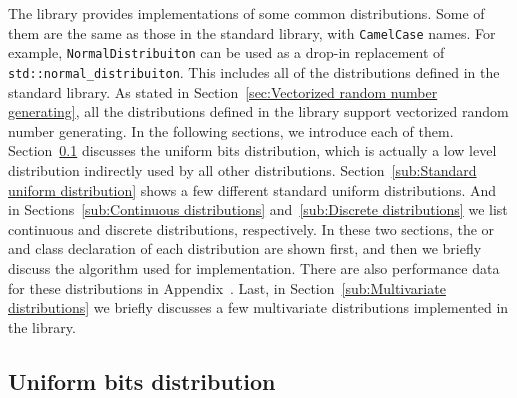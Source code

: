 The library provides implementations of some common distributions. Some of them
are the same as those in the standard library, with \verb|CamelCase| names. For
example, \verb|NormalDistribuiton| can be used as a drop-in replacement of
\verb|std::normal_distribuiton|. This includes all of the distributions defined
in the standard library. As stated in Section~\ref{sec:Vectorized random number
  generating}, all the distributions defined in the library support vectorized
random number generating. In the following sections, we introduce each
of them. Section~\ref{sub:Uniform bits distribution} discusses the uniform bits
distribution, which is actually a low level distribution indirectly used by all
other distributions. Section~\ref{sub:Standard uniform distribution} shows a
few different standard uniform distributions. And in
Sections~\ref{sub:Continuous distributions} and~\ref{sub:Discrete
  distributions} we list continuous and discrete distributions, respectively.
In these two sections, the \pdf or \pmf and class declaration of each
distribution are shown first, and then we briefly discuss the algorithm used
for implementation. There are also performance data for these distributions in
Appendix~. Last, in Section~\ref{sub:Multivariate
  distributions} we briefly discusses a few multivariate distributions
implemented in the library.

\subsection{Uniform bits distribution}
\label{sub:Uniform bits distribution}

